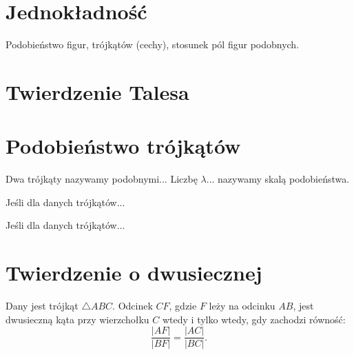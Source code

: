 %

\section{Jednokładność}
Podobieństwo figur, trójkątów (cechy), stosunek pól figur podobnych.

\section{Twierdzenie Talesa}


\section{Podobieństwo trójkątów}
\begin{definition}
	Dwa trójkąty nazywamy podobnymi...
	Liczbę $\lambda$... nazywamy skalą podobieństwa.
\end{definition}

\begin{proposition}
	Jeśli dla danych trójkątów...
\end{proposition}

\begin{proposition}
	Jeśli dla danych trójkątów...
\end{proposition}




\section{Twierdzenie o dwusiecznej}

\begin{proposition}
	Dany jest trójkąt $\triangle ABC$.
	Odcinek $CF$, gdzie $F$ leży na odcinku $AB$, jest dwusieczną kąta przy wierzchołku $C$ wtedy i tylko wtedy, gdy zachodzi równość:
	\begin{equation}
		\frac{|AF|}{|BF|} = \frac{|AC|}{|BC|}.
	\end{equation}
\end{proposition}

